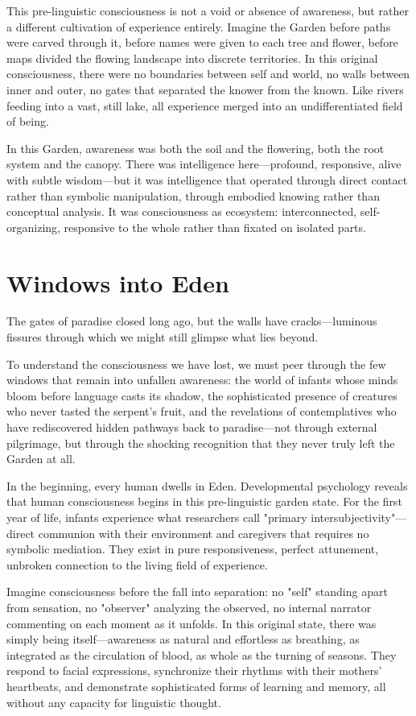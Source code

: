 This pre-linguistic consciousness is not a void or absence of awareness, but rather a different cultivation of experience entirely. Imagine the Garden before paths were carved through it, before names were given to each tree and flower, before maps divided the flowing landscape into discrete territories. In this original consciousness, there were no boundaries between self and world, no walls between inner and outer, no gates that separated the knower from the known. Like rivers feeding into a vast, still lake, all experience merged into an undifferentiated field of being.

In this Garden, awareness was both the soil and the flowering, both the root system and the canopy. There was intelligence here—profound, responsive, alive with subtle wisdom—but it was intelligence that operated through direct contact rather than symbolic manipulation, through embodied knowing rather than conceptual analysis. It was consciousness as ecosystem: interconnected, self-organizing, responsive to the whole rather than fixated on isolated parts.

\section{Windows into Eden}

The gates of paradise closed long ago, but the walls have cracks—luminous fissures through which we might still glimpse what lies beyond.

To understand the consciousness we have lost, we must peer through the few windows that remain into unfallen awareness: the world of infants whose minds bloom before language casts its shadow, the sophisticated presence of creatures who never tasted the serpent's fruit, and the revelations of contemplatives who have rediscovered hidden pathways back to paradise—not through external pilgrimage, but through the shocking recognition that they never truly left the Garden at all.

In the beginning, every human dwells in Eden. Developmental psychology reveals that human consciousness begins in this pre-linguistic garden state. For the first year of life, infants experience what researchers call "primary intersubjectivity"—direct communion with their environment and caregivers that requires no symbolic mediation. They exist in pure responsiveness, perfect attunement, unbroken connection to the living field of experience.

Imagine consciousness before the fall into separation: no "self" standing apart from sensation, no "observer" analyzing the observed, no internal narrator commenting on each moment as it unfolds. In this original state, there was simply being itself—awareness as natural and effortless as breathing, as integrated as the circulation of blood, as whole as the turning of seasons. They respond to facial expressions, synchronize their rhythms with their mothers' heartbeats, and demonstrate sophisticated forms of learning and memory, all without any capacity for linguistic thought.

